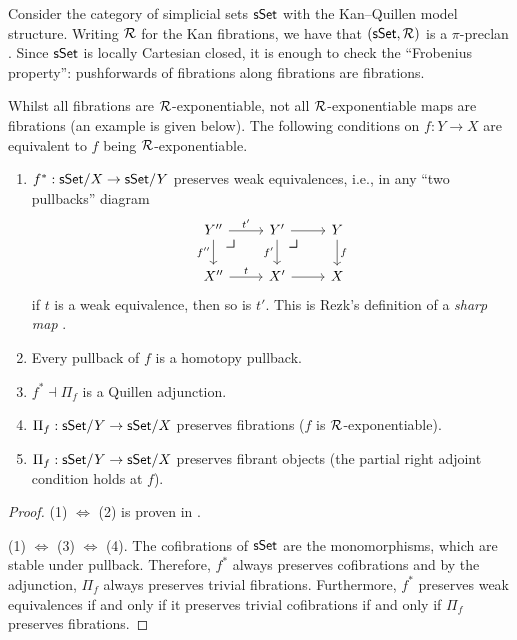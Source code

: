 \begin{example}
  \label{ex:sset-kan}
  Consider the category of simplicial sets $\mathsf{sSet}$
  with the Kan--Quillen model structure.
  Writing $\mathcal{R}$ for the Kan fibrations,
  we have that $(\mathsf{sSet}, \mathcal{R})$ is a $\pi$-preclan \cite{joyal2017}.
  Since $\mathsf{sSet}$ is locally Cartesian closed,
  it is enough to check the ``Frobenius property'':
  pushforwards of fibrations along fibrations are fibrations.

  Whilst all fibrations are $\mathcal{R}$-exponentiable,
  not all $\mathcal{R}$-exponentiable maps are fibrations
  (an example is given below).
  The following conditions on $f : Y \to X$ are equivalent
  to $f$ being $\mathcal{R}$-exponentiable.
  \begin{enumerate}
  \item
    $f^* : \mathsf{sSet}/X \to \mathsf{sSet}/Y$ preserves weak equivalences,
    i.e., in any ``two pullbacks'' diagram
    \[
      \begin{tikzcd}
        Y'' \ar[r, "t'"] \ar[d, "f''"'] \pbcorner &
        Y' \ar[r] \ar[d, "f'"'] \pbcorner & Y \ar[d, "f"] \\
        X'' \ar[r, "t"] & X' \ar[r] & X
      \end{tikzcd}
    \]
    if $t$ is a weak equivalence, then so is $t'$.
    This is Rezk's definition of a \emph{sharp map} \cite{rezk1998}.
  \item
    Every pullback of $f$ is a homotopy pullback.
  \item
    $f^* \dashv \Pi_f$ is a Quillen adjunction.
  \item
    $\Pi_f : \mathsf{sSet}/Y \to \mathsf{sSet}/X$ preserves fibrations
    ($f$ is $\mathcal{R}$-exponentiable).
  \item
    $\Pi_f : \mathsf{sSet}/Y \to \mathsf{sSet}/X$ preserves fibrant objects
    (the partial right adjoint condition holds at $f$).
  \end{enumerate}

  \begin{proof}
    (1) $\Leftrightarrow$ (2) is
    proven in \cite[Proposition 2.7]{rezk1998}.

    (1) $\Leftrightarrow$ (3) $\Leftrightarrow$ (4).
    The cofibrations of $\mathsf{sSet}$ are the monomorphisms,
    which are stable under pullback.
    Therefore, $f^*$ always preserves cofibrations
    and by the adjunction, $\Pi_f$ always preserves trivial fibrations.
    Furthermore,
    $f^*$ preserves weak equivalences if and only if it preserves trivial cofibrations
    if and only if $\Pi_f$ preserves fibrations.


\end{proof}
\end{example}
